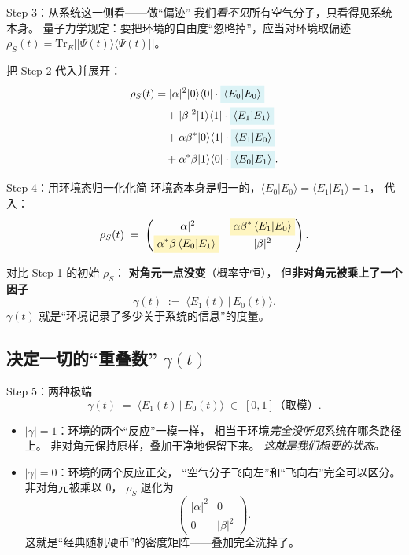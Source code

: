 \documentclass[11pt,a4paper]{ctexart}
\newcommand{\hl}[1]{\colorbox{Goldenrod!28}{$\displaystyle #1$}}
\newcommand{\hlb}[1]{\colorbox{SkyBlue!22}{$\displaystyle #1$}}
\begin{document}
\begin{stepblock}{Step 3：从系统这一侧看——做``偏迹''}
我们\emph{看不见}所有空气分子，只看得见系统本身。
量子力学规定：要把环境的自由度``忽略掉''，应当对环境取偏迹
$\rho_S(t) = \mathrm{Tr}_E\bigl[\lvert\Psi(t)\rangle\langle\Psi(t)\rvert\bigr]$。
\smallskip

把 Step 2 代入并展开：
\begin{align*}
  \rho_S(t)
  &= |\alpha|^2 \lvert 0\rangle\langle 0\rvert
     \cdot \hlb{\langle E_0|E_0\rangle} \\
  &\quad + |\beta|^2 \lvert 1\rangle\langle 1\rvert
     \cdot \hlb{\langle E_1|E_1\rangle} \\
  &\quad + \alpha\beta^{*} \lvert 0\rangle\langle 1\rvert
     \cdot \hlb{\langle E_1|E_0\rangle} \\
  &\quad + \alpha^{*}\beta \lvert 1\rangle\langle 0\rvert
     \cdot \hlb{\langle E_0|E_1\rangle}.
\end{align*}
\end{stepblock}

\begin{stepblock}{Step 4：用环境态归一化化简}
环境态本身是归一的，$\langle E_0|E_0\rangle = \langle E_1|E_1\rangle = 1$，
代入：
\[
  \rho_S(t)
  \;=\;
  \begin{pmatrix}
    |\alpha|^2 & \hl{\alpha\beta^{*}\,\langle E_1|E_0\rangle} \\[2pt]
    \hl{\alpha^{*}\beta\,\langle E_0|E_1\rangle} & |\beta|^2
  \end{pmatrix}.
\]

对比 Step 1 的初始 $\rho_S$：
\textbf{对角元一点没变}（概率守恒），
但\textbf{非对角元被乘上了一个因子}
\[
  \gamma(t) \;:=\; \langle E_1(t)\,|\,E_0(t)\rangle.
\]
$\gamma(t)$ 就是``环境记录了多少关于系统的信息''的度量。
\end{stepblock}

\subsection{决定一切的``重叠数'' $\gamma(t)$}

\begin{stepblock}{Step 5：两种极端}
\[
  \gamma(t) \;=\; \langle E_1(t)\,|\,E_0(t)\rangle
  \;\in\;[0,1] \text{（取模）}.
\]
\begin{itemize}
  \item \textbf{$|\gamma|=1$}：环境的两个``反应''一模一样，
        相当于环境\emph{完全没听见}系统在哪条路径上。
        非对角元保持原样，叠加干净地保留下来。
        \emph{这就是我们想要的状态。}
  \item \textbf{$|\gamma|=0$}：环境的两个反应正交，
        ``空气分子飞向左''和``飞向右''完全可以区分。
        非对角元被乘以 $0$，
        $\rho_S$ 退化为
        \[
          \begin{pmatrix} |\alpha|^2 & 0 \\ 0 & |\beta|^2 \end{pmatrix}.
        \]
        这就是``经典随机硬币''的密度矩阵——叠加完全洗掉了。
\end{itemize}
\end{stepblock}
\end{document}
